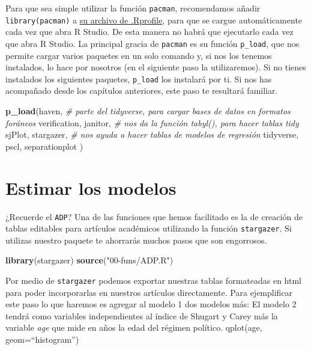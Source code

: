 \documentclass[]{book}
\newenvironment{Shaded}{\begin{snugshade}}{\end{snugshade}}
\newcommand{\KeywordTok}[1]{\textcolor[rgb]{0.13,0.29,0.53}{\textbf{#1}}}
\newcommand{\StringTok}[1]{\textcolor[rgb]{0.31,0.60,0.02}{#1}}
\newcommand{\CommentTok}[1]{\textcolor[rgb]{0.56,0.35,0.01}{\textit{#1}}}
\newcommand{\NormalTok}[1]{#1}
\begin{document}
Para que sea simple utilizar la función \texttt{pacman}, recomendamos
añadir \texttt{library(pacman)} a
\href{http://www.statmethods.net/interface/customizing.html}{su archivo
de .Rprofile}, para que se cargue automáticamente cada vez que abra R
Studio. De esta manera no habrá que ejecutarlo cada vez que abra R
Studio. La principal gracia de \texttt{pacman} es su función
\texttt{p\_load}, que nos permite cargar varios paquetes en un solo
comando y, si nos los tenemos instalados, lo hace por nosotros (en el
siguiente paso la utilizaremos). Si no tienes instalados los siguientes
paquetes, \texttt{p\_load} los instalará por ti. Si nos has acompañado
desde los capítulos anteriores, este paso te resultará familiar.

\begin{Shaded}
\begin{Highlighting}[]
\KeywordTok{p_load}\NormalTok{(haven,    }\CommentTok{# parte del tidyverse, para cargar bases de datos en formatos foráneos}
\NormalTok{       verification,}
\NormalTok{       janitor,  }\CommentTok{# nos da la función tabyl(), para hacer tablas tidy}
\NormalTok{       sjPlot,}
\NormalTok{       stargazer, }\CommentTok{# nos ayuda a hacer tablas de modelos de regresión}
\NormalTok{       tidyverse,}
\NormalTok{       pscl,}
\NormalTok{       separationplot}
\NormalTok{       )}
\end{Highlighting}
\end{Shaded}

\section{Estimar los modelos}\label{estimar-los-modelos}

¿Recuerde el \texttt{ADP}? Una de las funciones que hemos facilitado es
la de creación de tablas editables para artículos académicos utilizando
la función \texttt{stargazer}. Si utilizas nuestro paquete te ahorrarás
muchos pasos que son engorrosos.

\begin{Shaded}
\begin{Highlighting}[]
\KeywordTok{library}\NormalTok{(stargazer)}
\KeywordTok{source}\NormalTok{(}\StringTok{"00-funs/ADP.R"}\NormalTok{)}
\end{Highlighting}
\end{Shaded}

Por medio de \texttt{stargazer} podemos exportar nuestras tablas
formateadas en html para poder incorporarlas en nuestros artículos
directamente. Para ejemplificar este paso lo que haremos es agregar al
modelo 1 dos modelos más: El modelo 2 tendrá como variables
independientes al índice de Shugart y Carey más la variable \emph{age}
que mide en años la edad del régimen político. qplot(age,
geom=``histogram'')
\end{document}
